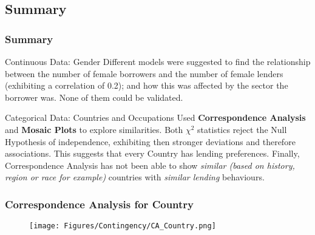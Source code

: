\documentclass{beamer}
\begin{document}

\subsection{Summary}
\begin{frame}\frametitle{Summary}
\footnotesize{
\begin{block}{Continuous Data: Gender}
Different models were suggested to find the relationship between the number of female borrowers and the number of female lenders (exhibiting a correlation of 0.2); and how this was affected by the sector the borrower was. None of them could be validated.
\end{block}

\begin{block}{Categorical Data: Countries and Occupations}
Used \textbf{Correspondence Analysis} and \textbf{Mosaic Plots} to explore similarities.
Both $\chi^2$ statistics reject the Null Hypothesis of independence, exhibiting then stronger deviations and therefore associations. This suggests that every Country has lending preferences. Finally, Correspondence Analysis has not been able to show \textit{similar (based on history, region or race for example)} countries with \textit{similar lending} behaviours. \par
\end{block}
}
\end{frame}


\begin{frame}
\frametitle{Correspondence Analysis for Country}
\begin{figure}
\texttt{[image: Figures/Contingency/CA\_Country.png]}
\end{figure}
\end{frame}
\end{document}
